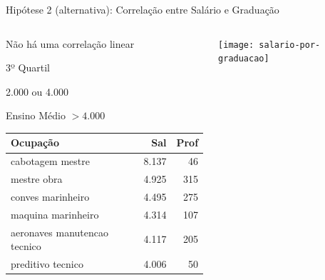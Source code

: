 \documentclass[10pt, hyperref={pdfpagelabels=false}]{beamer}
\begin{document}
{
\begin{frame}[c, label=hipotese-salario-graduacao]{Hipótese 2 (alternativa): Correlação entre Salário e Graduação}
  \begin{center}
    \begin{columns}[onlytextwidth]
      \begin{column}{0.5\textwidth}
        \centering
        Não há uma correlação linear
        
        \vspace{\baselineskip}
        
        3º Quartil
        
        2.000 ou 4.000
        
        \vspace{\baselineskip}
        
        Ensino Médio $> 4.000$
        
        \vspace{0.5\baselineskip}
        
        \tiny
        \begin{table}[!h]
          \begin{tabular}{l|r|r}
            \hline
            Ocupação & Sal & Prof\\
            \hline
            \alert{cabotagem mestre} & 8.137 & 46\\
            \hline
            mestre obra & 4.925 & 315\\
            \hline
            conves marinheiro & 4.495 & 275\\
            \hline
            maquina marinheiro & 4.314 & 107\\
            \hline
            aeronaves manutencao tecnico & 4.117 & 205\\
            \hline
            preditivo tecnico & 4.006 & 50\\
            \hline
          \end{tabular}
        \end{table}
      \end{column}
      
      \begin{column}{0.5\textwidth}
        \texttt{[image: salario-por-graduacao]}
      \end{column}
    \end{columns}
  \end{center}
\end{frame}
}
\end{document}
